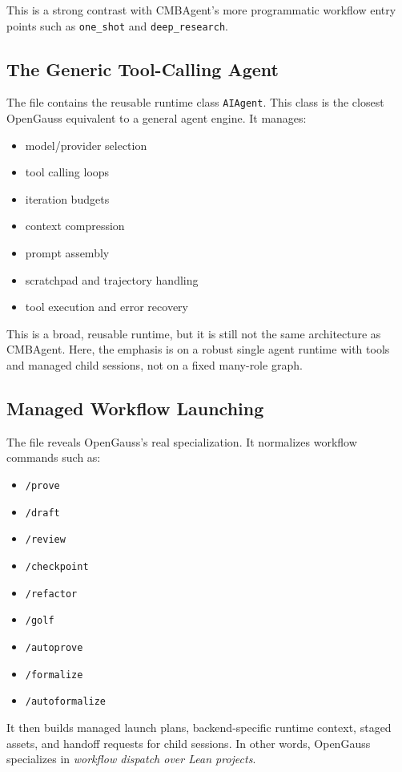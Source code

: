 \documentclass[11pt,a4paper]{article}
\begin{document}
This is a strong contrast with CMBAgent's more programmatic workflow entry
points such as \texttt{one\_shot} and \texttt{deep\_research}.

\subsection{The Generic Tool-Calling Agent}
The file  contains the reusable runtime class
\texttt{AIAgent}. This class is the closest OpenGauss equivalent to a general
agent engine. It manages:
\begin{itemize}[leftmargin=1.5em]
\item model/provider selection
\item tool calling loops
\item iteration budgets
\item context compression
\item prompt assembly
\item scratchpad and trajectory handling
\item tool execution and error recovery
\end{itemize}

This is a broad, reusable runtime, but it is still not the same architecture as
CMBAgent. Here, the emphasis is on a robust single agent runtime with tools and
managed child sessions, not on a fixed many-role graph.

\subsection{Managed Workflow Launching}
The file  reveals OpenGauss's real
specialization. It normalizes workflow commands such as:
\begin{itemize}[leftmargin=1.5em]
\item \texttt{/prove}
\item \texttt{/draft}
\item \texttt{/review}
\item \texttt{/checkpoint}
\item \texttt{/refactor}
\item \texttt{/golf}
\item \texttt{/autoprove}
\item \texttt{/formalize}
\item \texttt{/autoformalize}
\end{itemize}

It then builds managed launch plans, backend-specific runtime context, staged
assets, and handoff requests for child sessions. In other words, OpenGauss
specializes in \emph{workflow dispatch over Lean projects}.
\end{document}
